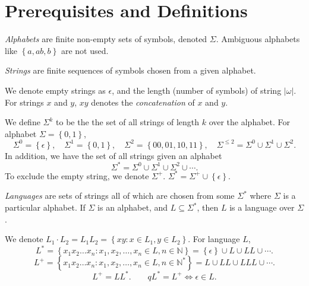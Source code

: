\section{Prerequisites and Definitions}
\begin{definition}[Alphabet]
  \textit{Alphabets} are finite non-empty sets of symbols, denoted $\Sigma$.
   Ambiguous alphabets like $\left\{ a,ab,b \right\}$ are not used.
\end{definition}
\begin{definition}[String]
  \textit{Strings} are finite sequences of symbols chosen from a given
  alphabet. 
\end{definition}
\begin{notation}
  We denote empty strings as $\epsilon$, and the length (number of
  symbols) of string $\left| \omega \right| $. For strings $x$ and $y$, $xy$ denotes
  the \textit{concatenation} of $x$ and $y$.
\end{notation}
\begin{example}
   We define $\Sigma^{k}$ to be the the set of all strings of length $k$ over
   the alphabet. For alphabet $\Sigma=\left\{ 0,1 \right\}$,
     \[\Sigma^{0}=\left\{ \epsilon \right\},\quad
     \Sigma^{1}=\left\{ 0,1 \right\},\quad
     \Sigma^{2}=\left\{ 00,01,10,11 \right\},\quad
     \Sigma^{\le 2}=\Sigma^{0}\cup \Sigma^{1}\cup \Sigma^{2}.\] 
   In addition, we have the set of all strings given an alphabet
   \[\Sigma^{*}=\Sigma^{0}\cup \Sigma^{1}\cup \Sigma^{2}\cup \cdots.\]
   To exclude the empty string, we denote $\Sigma^{+}$.
  $\Sigma^{*}=\Sigma^{+}\cup \left\{ \epsilon \right\}$.
\end{example}
\begin{definition}[Language]
  \textit{Languages} are sets of strings all of which are chosen from some
  $\Sigma^{*}$ where $\Sigma$ is a particular alphabet. If $\Sigma$ is an alphabet,
  and $L\subseteq \Sigma^{*}$, then $L$ is a language over $\Sigma$.
\end{definition}
\begin{notation}
  We denote $L_1\cdot L_2=L_1L_2=\left\{ xy:x\in L_1, y\in L_2 \right\}$. For
  language $L$,
  \[L^{*}=\left\{ x_1x_2\ldots x_{n}:x_1,x_2,\ldots,x_{n}\in L,n\in
  \mathbb{N}\right\}=\left\{ \epsilon \right\}\cup L\cup LL\cup\cdots.\]
  \[L^{+}=\left\{ x_1x_2\ldots x_{n}:x_1,x_2,\ldots,x_{n}\in L,n\in
  \mathbb{N}^{*}\right\}=L\cup LL\cup LLL\cup \cdots.\]
  \[L^{+}=LL^{*}.\qquad qL^{*}=L^{+}\iff\epsilon\in L.\] 
\end{notation}
